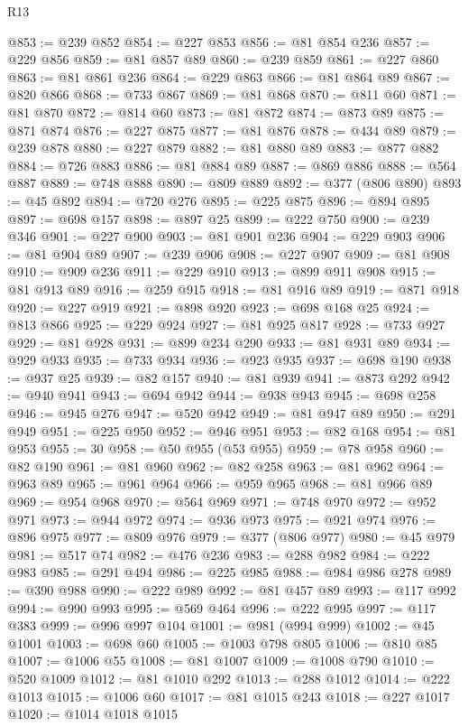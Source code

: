 \begin{lexlean}{R13}
\begin{coremodule}
@853 := @239 @852
@854 := @227 @853
@856 := @81 @854 @236
@857 := @229 @856
@859 := @81 @857 @89
@860 := @239 @859
@861 := @227 @860
@863 := @81 @861 @236
@864 := @229 @863
@866 := @81 @864 @89
@867 := @820 @866
@868 := @733 @867
@869 := @81 @868
@870 := @811 @60
@871 := @81 @870
@872 := @814 @60
@873 := @81 @872
@874 := @873 @89
@875 := @871 @874
@876 := @227 @875
@877 := @81 @876
@878 := @434 @89
@879 := @239 @878
@880 := @227 @879
@882 := @81 @880 @89
@883 := @877 @882
@884 := @726 @883
@886 := @81 @884 @89
@887 := @869 @886
@888 := @564 @887
@889 := @748 @888
@890 := @809 @889
@892 := @377 (@806 @890)
@893 := @45 @892
@894 := @720 @276
@895 := @225 @875
@896 := @894 @895
@897 := @698 @157
@898 := @897 @25
@899 := @222 @750
@900 := @239 @346
@901 := @227 @900
@903 := @81 @901 @236
@904 := @229 @903
@906 := @81 @904 @89
@907 := @239 @906
@908 := @227 @907
@909 := @81 @908
@910 := @909 @236
@911 := @229 @910
@913 := @899 @911 @908
@915 := @81 @913 @89
@916 := @259 @915
@918 := @81 @916 @89
@919 := @871 @918
@920 := @227 @919
@921 := @898 @920
@923 := @698 @168 @25
@924 := @813 @866
@925 := @229 @924
@927 := @81 @925 @817
@928 := @733 @927
@929 := @81 @928
@931 := @899 @234 @290
@933 := @81 @931 @89
@934 := @929 @933
@935 := @733 @934
@936 := @923 @935
@937 := @698 @190
@938 := @937 @25
@939 := @82 @157
@940 := @81 @939
@941 := @873 @292
@942 := @940 @941
@943 := @694 @942
@944 := @938 @943
@945 := @698 @258
@946 := @945 @276
@947 := @520 @942
@949 := @81 @947 @89
@950 := @291 @949
@951 := @225 @950
@952 := @946 @951
@953 := @82 @168
@954 := @81 @953
@955 := 30
@958 := @50 @955 (@53 @955)
@959 := @78 @958
@960 := @82 @190
@961 := @81 @960
@962 := @82 @258
@963 := @81 @962
@964 := @963 @89
@965 := @961 @964
@966 := @959 @965
@968 := @81 @966 @89
@969 := @954 @968
@970 := @564 @969
@971 := @748 @970
@972 := @952 @971
@973 := @944 @972
@974 := @936 @973
@975 := @921 @974
@976 := @896 @975
@977 := @809 @976
@979 := @377 (@806 @977)
@980 := @45 @979
@981 := @517 @74
@982 := @476 @236
@983 := @288 @982
@984 := @222 @983
@985 := @291 @494
@986 := @225 @985
@988 := @984 @986 @278
@989 := @390 @988
@990 := @222 @989
@992 := @81 @457 @89
@993 := @117 @992
@994 := @990 @993
@995 := @569 @464
@996 := @222 @995
@997 := @117 @383
@999 := @996 @997 @104
@1001 := @981 (@994 @999)
@1002 := @45 @1001
@1003 := @698 @60
@1005 := @1003 @798 @805
@1006 := @810 @85
@1007 := @1006 @55
@1008 := @81 @1007
@1009 := @1008 @790
@1010 := @520 @1009
@1012 := @81 @1010 @292
@1013 := @288 @1012
@1014 := @222 @1013
@1015 := @1006 @60
@1017 := @81 @1015 @243
@1018 := @227 @1017
@1020 := @1014 @1018 @1015

\end{coremodule}
\end{lexlean}
